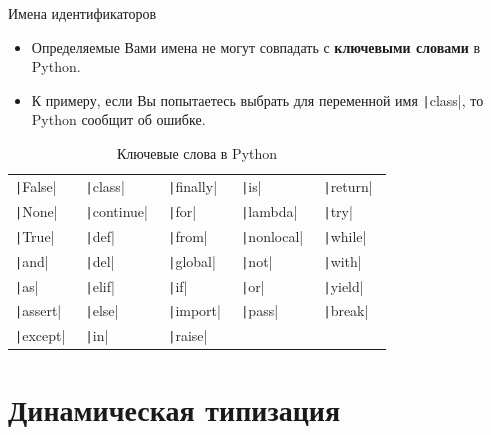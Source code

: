 \documentclass[aspectratio=169]{beamer}	%
\begin{document}
\begin{frame}[fragile]{Имена идентификаторов}
\scriptsize
\begin{itemize}
	\item Определяемые Вами имена не могут совпадать с \textbf{ключевыми словами} в Python.
	\item К примеру, если Вы попытаетесь выбрать для переменной имя \texttt|class|, то Python сообщит об ошибке.
\end{itemize}
\begin{table}[h!]
\caption{Ключевые слова в Python}
\centering
\begin{tabular}{p{0.15\linewidth}p{0.15\linewidth}p{0.15\linewidth}p{0.15\linewidth}p{0.15\linewidth}}
	
	\hline
	\texttt|False| & 
	\texttt|class| & \texttt|finally| & \texttt|is| &
	\texttt|return| \\
	
	\texttt|None| & 
	\texttt|continue| & \texttt|for| & \texttt|lambda| &
	\texttt|try| \\
	
	\texttt|True| & 
	\texttt|def| &
	\texttt|from| &
	\texttt|nonlocal| &
	\texttt|while| \\
	
	\texttt|and| & \texttt|del| &
	\texttt|global| &
	\texttt|not| &
	\texttt|with| \\
	
	\texttt|as| & \texttt|elif| &
	\texttt|if| &
	\texttt|or| &
	\texttt|yield| \\
	
	\texttt|assert| & \texttt|else| &
	\texttt|import| &
	\texttt|pass| &
	\texttt|break| \\
	
	\texttt|except| & \texttt|in| &
	\texttt|raise| &
	&
	\\ 
	\hline
\end{tabular}
\end{table}
\vfill
\end{frame}

\section{Динамическая типизация}
\sectionframe
\end{document}
